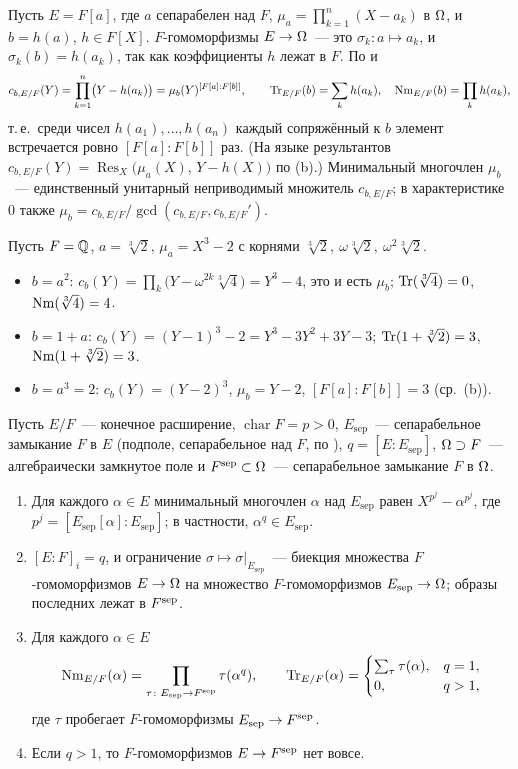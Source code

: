 \begin{example}
Пусть $E=F[a]$, где $a$ сепарабелен над $F$, $\mu_a=\prod_{k=1}^n(X-a_k)$ в $\Omega$, и $b=h(a)$, $h\in F[X]$.
$F$-гомоморфизмы $E\to\Omega$~--- это $\sigma_k\colon a\mapsto a_k$, и $\sigma_k(b)=h(a_k)$, так как коэффициенты $h$ лежат
в $F$. По  и 
\[
c_{b,E/F}(Y)=\prod_{k=1}^n\bigl(Y-h(a_k)\bigr)=\mu_b(Y)^{[F[a]:F[b]]},\qquad
\operatorname{Tr}_{E/F}(b)=\sum_kh(a_k),\quad \operatorname{Nm}_{E/F}(b)=\prod_kh(a_k),
\]
т.\,е.\ среди чисел $h(a_1),\dots,h(a_n)$ каждый сопряжённый к $b$ элемент встречается ровно $[F[a]:F[b]]$ раз. (На языке
результантов $c_{b,E/F}(Y)=\operatorname{Res}_X\bigl(\mu_a(X),\,Y-h(X)\bigr)$ по (b).) Минимальный многочлен $\mu_b$~---
единственный унитарный неприводимый множитель $c_{b,E/F}$; в характеристике $0$ также
$\mu_b=c_{b,E/F}/\gcd(c_{b,E/F},c_{b,E/F}')$.

Пусть $F=\mathbb Q$, $a=\sqrt[3]2$, $\mu_a=X^3-2$ с корнями $\sqrt[3]2,\ \omega\sqrt[3]2,\ \omega^2\sqrt[3]2$.
\begin{itemize}[leftmargin=*]
\item $b=a^2$: $c_b(Y)=\prod_k\bigl(Y-\omega^{2k}\sqrt[3]4\bigr)=Y^3-4$, это и есть $\mu_b$; $\operatorname{Tr}(\sqrt[3]4)=0$,
$\operatorname{Nm}(\sqrt[3]4)=4$.
\item $b=1+a$: $c_b(Y)=(Y-1)^3-2=Y^3-3Y^2+3Y-3$; $\operatorname{Tr}(1+\sqrt[3]2)=3$, $\operatorname{Nm}(1+\sqrt[3]2)=3$.
\item $b=a^3=2$: $c_b(Y)=(Y-2)^3$, $\mu_b=Y-2$, $[F[a]:F[b]]=3$ (ср.\ (b)).
\end{itemize}
\end{example}

\begin{proposition}
Пусть $E/F$~--- конечное расширение, $\operatorname{char}F=p>0$, $E_{\mathrm{sep}}$~--- сепарабельное замыкание $F$ в
$E$ (подполе, сепарабельное над $F$, по ), $q=[E:E_{\mathrm{sep}}]$, $\Omega\supset F$~--- алгебраически замкнутое поле
и $F^{\mathrm{sep}}\subset\Omega$~--- сепарабельное замыкание $F$ в $\Omega$.
\begin{enumerate}[label=\textup{(\alph*)}]
\item Для каждого $\alpha\in E$ минимальный многочлен $\alpha$ над $E_{\mathrm{sep}}$ равен $X^{p^j}-\alpha^{p^j}$, где
$p^j=[E_{\mathrm{sep}}[\alpha]:E_{\mathrm{sep}}]$; в частности, $\alpha^q\in E_{\mathrm{sep}}$.
\item $[E:F]_i=q$, и ограничение $\sigma\mapsto\sigma|_{E_{\mathrm{sep}}}$~--- биекция множества $F$-гомоморфизмов
$E\to\Omega$ на множество $F$-гомоморфизмов $E_{\mathrm{sep}}\to\Omega$; образы последних лежат в $F^{\mathrm{sep}}$.
\item Для каждого $\alpha\in E$
\[
\operatorname{Nm}_{E/F}(\alpha)=\prod_{\tau\colon E_{\mathrm{sep}}\to F^{\mathrm{sep}}}\tau(\alpha^q),\qquad
\operatorname{Tr}_{E/F}(\alpha)=\begin{cases}\sum_\tau\tau(\alpha),& q=1,\\ 0,& q>1,\end{cases}
\]
где $\tau$ пробегает $F$-гомоморфизмы $E_{\mathrm{sep}}\to F^{\mathrm{sep}}$.
\item Если $q>1$, то $F$-гомоморфизмов $E\to F^{\mathrm{sep}}$ нет вовсе.
\end{enumerate}
\end{proposition}

